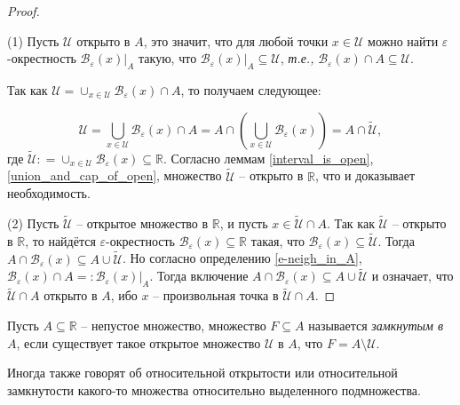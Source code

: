 \begin{proof}~

(1) Пусть $\mathscr{U}$ открыто в $A$, это значит, что для любой точки $x \in \mathscr{U}$ можно найти $\varepsilon$-окрестность $\mathscr{B}_\varepsilon(x)|_A$ такую, что $\mathscr{B}_\varepsilon(x)|_A \subseteq \mathscr{U}$, \textit{т.е.,} $\mathscr{B}_\varepsilon(x) \cap A \subseteq \mathscr{U}$.

Так как $\mathscr{U} = \cup_{x \in \mathscr{U}} \mathscr{B}_\varepsilon(x) \cap A$, то получаем следующее:

\[
 \mathscr{U} = \bigcup_{x \in \mathscr{U}} \mathscr{B}_\varepsilon(x) \cap A = A \cap \left( \bigcup_{x \in \mathscr{U}} \mathscr{B}_\varepsilon(x) \right) =  A \cap \widetilde{\mathscr{U}},
\]
где $\widetilde{\mathscr{U}}: = \cup_{x\in \mathscr{U}} \mathscr{B}_\varepsilon(x) \subseteq \mathbb{R}$. Согласно леммам \ref{interval_is_open}, \ref{union_and_cap_of_open}, множество $\widetilde{\mathscr{U}}$ -- открыто в $\mathbb{R}$, что и доказывает необходимость.


(2) Пусть $\widetilde{\mathscr{U}}$ -- открытое множество в $\mathbb{R}$, и пусть $x \in \widetilde{\mathscr{U}} \cap A$. Так как $\widetilde{\mathscr{U}}$ -- открыто в $\mathbb{R}$, то найдётся $\varepsilon$-окрестность $\mathscr{B}_\varepsilon(x) \subseteq \mathbb{R}$ такая, что $\mathscr{B}_\varepsilon(x) \subseteq \widetilde{\mathscr{U}}$. Тогда $A \cap \mathscr{B}_\varepsilon(x) \subseteq A \cup \widetilde{\mathscr{U}}$. Но согласно определению \ref{e-neigh_in_A}, $\mathscr{B}_\varepsilon(x)\cap A = : \mathscr{B}_\varepsilon(x)|_A$. Тогда включение $A \cap \mathscr{B}_\varepsilon(x) \subseteq A \cup \widetilde{\mathscr{U}}$ и означает, что $\widetilde{\mathscr{U}} \cap A$ открыто в $A$, ибо $x$ -- произвольная точка в $\widetilde{\mathscr{U}} \cap A.$
\end{proof}

\begin{definition}\label{closed_in_A}
    Пусть $A \subseteq \mathbb{R}$ -- непустое множество, множество $F \subseteq A$ называется \textit{замкнутым в $A$}, если существует такое открытое множество $\mathscr{U}$ в $A$, что $F = A \setminus \mathscr{U}$. 
\end{definition}

\begin{remark}
    Иногда также говорят об относительной открытости или относительной замкнутости какого-то множества относительно выделенного подмножества.
\end{remark}

